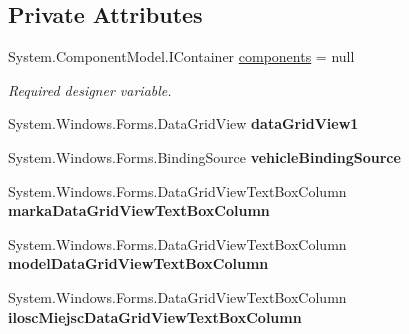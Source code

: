 \subsection*{Private Attributes}
\begin{DoxyCompactItemize}
\item 
System.\+Component\+Model.\+I\+Container \mbox{\hyperlink{class_statystyki___o_s_p_1_1_vehicle_list_form_a9b4f34a0698ca5a4cb348f402d7d9708}{components}} = null
\begin{DoxyCompactList}\small\item\em Required designer variable. \end{DoxyCompactList}\item 
\mbox{\label{class_statystyki___o_s_p_1_1_vehicle_list_form_a1de883fe6a85b6e4fcf47b6631ccb518}} 
System.\+Windows.\+Forms.\+Data\+Grid\+View {\bfseries data\+Grid\+View1}
\item 
\mbox{\label{class_statystyki___o_s_p_1_1_vehicle_list_form_ac30811ccd9e12035a3ad06865a46a532}} 
System.\+Windows.\+Forms.\+Binding\+Source {\bfseries vehicle\+Binding\+Source}
\item 
\mbox{\label{class_statystyki___o_s_p_1_1_vehicle_list_form_a022702df355c7268bfd8118fe838634f}} 
System.\+Windows.\+Forms.\+Data\+Grid\+View\+Text\+Box\+Column {\bfseries marka\+Data\+Grid\+View\+Text\+Box\+Column}
\item 
\mbox{\label{class_statystyki___o_s_p_1_1_vehicle_list_form_a48e945e0bf3d96b156f10e1ab488197d}} 
System.\+Windows.\+Forms.\+Data\+Grid\+View\+Text\+Box\+Column {\bfseries model\+Data\+Grid\+View\+Text\+Box\+Column}
\item 
\mbox{\label{class_statystyki___o_s_p_1_1_vehicle_list_form_abae2a2ae1a8fe90d023f0d7217976551}} 
System.\+Windows.\+Forms.\+Data\+Grid\+View\+Text\+Box\+Column {\bfseries ilosc\+Miejsc\+Data\+Grid\+View\+Text\+Box\+Column}
\item 
\mbox{\label{class_statystyki___o_s_p_1_1_vehicle_list_form_a23797681643549fb8f491e0b14b3f130}} 

\end{DoxyCompactItemize}
